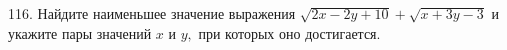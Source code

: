 116. Найдите наименьшее значение выражения $\sqrt{2x-2y+10}+\sqrt{x+3y-3}$ и укажите пары значений $x$ и $y,$ при которых оно достигается.\\
